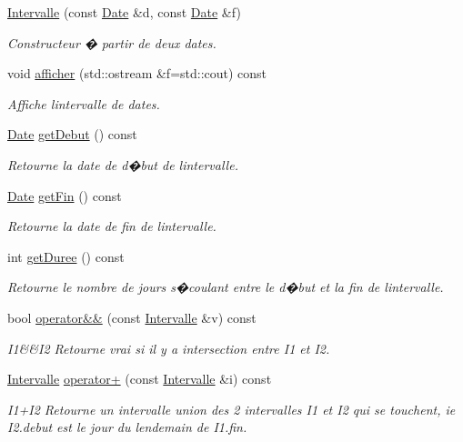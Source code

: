 \begin{DoxyCompactItemize}
\item 
\hyperlink{class_t_i_m_e_1_1_intervalle_a98b63f9c55a777090ec224d61ab26427}{Intervalle} (const \hyperlink{class_t_i_m_e_1_1_date}{Date} \&d, const \hyperlink{class_t_i_m_e_1_1_date}{Date} \&f)
\begin{DoxyCompactList}\small\item\em Constructeur � partir de deux dates. \end{DoxyCompactList}\item 
void \hyperlink{class_t_i_m_e_1_1_intervalle_a729d464967de6618da00b772357dc923}{afficher} (std\+::ostream \&f=std\+::cout) const 
\begin{DoxyCompactList}\small\item\em Affiche l\textquotesingle{}intervalle de dates. \end{DoxyCompactList}\item 
\hyperlink{class_t_i_m_e_1_1_date}{Date} \hyperlink{class_t_i_m_e_1_1_intervalle_a8a9980c16e051af5e08135815cc3d074}{get\+Debut} () const 
\begin{DoxyCompactList}\small\item\em Retourne la date de d�but de l\textquotesingle{}intervalle. \end{DoxyCompactList}\item 
\hyperlink{class_t_i_m_e_1_1_date}{Date} \hyperlink{class_t_i_m_e_1_1_intervalle_a20a035fb9d9720ef94e62e1ef45845c3}{get\+Fin} () const 
\begin{DoxyCompactList}\small\item\em Retourne la date de fin de l\textquotesingle{}intervalle. \end{DoxyCompactList}\item 
int \hyperlink{class_t_i_m_e_1_1_intervalle_adec63857259b690f79de8d16b0ca0c4d}{get\+Duree} () const 
\begin{DoxyCompactList}\small\item\em Retourne le nombre de jours s\textquotesingle{}�coulant entre le d�but et la fin de l\textquotesingle{}intervalle. \end{DoxyCompactList}\item 
bool \hyperlink{class_t_i_m_e_1_1_intervalle_a8f7dca71eb9d8648fa30225360df4fda}{operator\&\&} (const \hyperlink{class_t_i_m_e_1_1_intervalle}{Intervalle} \&v) const 
\begin{DoxyCompactList}\small\item\em I1\&\&I2 Retourne vrai si il y a intersection entre I1 et I2. \end{DoxyCompactList}\item 
\hyperlink{class_t_i_m_e_1_1_intervalle}{Intervalle} \hyperlink{class_t_i_m_e_1_1_intervalle_a9dfead5501b190507a2ffa5c29450ffe}{operator+} (const \hyperlink{class_t_i_m_e_1_1_intervalle}{Intervalle} \&i) const 
\begin{DoxyCompactList}\small\item\em I1+\+I2 Retourne un intervalle union des 2 intervalles I1 et I2 qui se touchent, ie I2.\+debut est le jour du lendemain de I1.\+fin. \end{DoxyCompactList}\end{DoxyCompactItemize}


